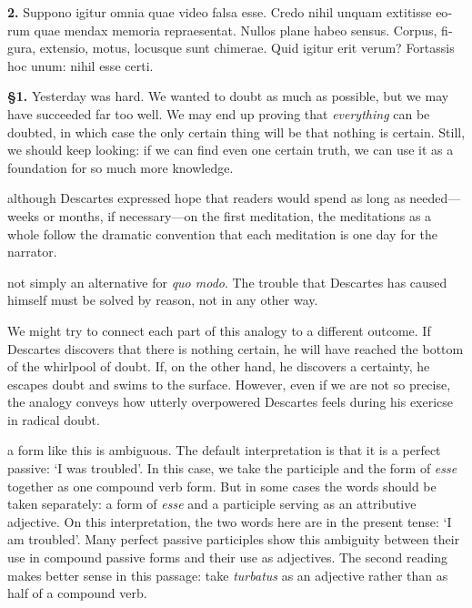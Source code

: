 \beginnumbering
\pstart
\begin{latin}
    \textenglish{\textbf{2.}} Suppono igitur omnia quae video falsa esse. Credo nihil unquam extitisse eorum quae mendax memoria repraesentat. Nullos plane habeo sensus. Corpus, figura, extensio, motus, locusque sunt chimerae. Quid igitur erit verum? Fortassis hoc unum: nihil esse certi.
\end{latin}
\pend
\endnumbering

\prenotes

\textbf{§1.} Yesterday was hard. We wanted to doubt as much as possible, but we may have succeeded far too well. We may end up proving that \textit{everything} can be doubted, in which case the only certain thing will be that nothing is certain. Still, we should keep looking: if we can find even one certain truth, we can use it as a foundation for so much more knowledge.

 although Descartes expressed hope that readers would spend as long as needed---weeks or months, if necessary---on the first meditation, the meditations as a whole follow the dramatic convention that each meditation is one day for the narrator.

 not simply an alternative for \textit{quo modo}. The trouble that Descartes has caused himself must be solved by reason, not in any other way.

 We might try to connect each part of this analogy to a different outcome. If Descartes discovers that there is nothing certain, he will have reached the bottom of the whirlpool of doubt. If, on the other hand, he discovers a certainty, he escapes doubt and swims to the surface. However, even if we are not so precise, the analogy conveys how utterly overpowered Descartes feels during his exericse in radical doubt.

 a form like this is ambiguous. The default interpretation is that it is a perfect passive: `I was troubled'. In this case, we take the participle and the form of \textit{esse} together as one compound verb form. But in some cases the words should be taken separately: a form of \textit{esse} and a participle serving as an attributive adjective. On this interpretation, the two words here are in the present tense: `I am troubled'. Many perfect passive participles show this ambiguity between their use in compound passive forms and their use as adjectives. The second reading makes better sense in this passage: take \textit{turbatus} as an adjective rather than as half of a compound verb.

